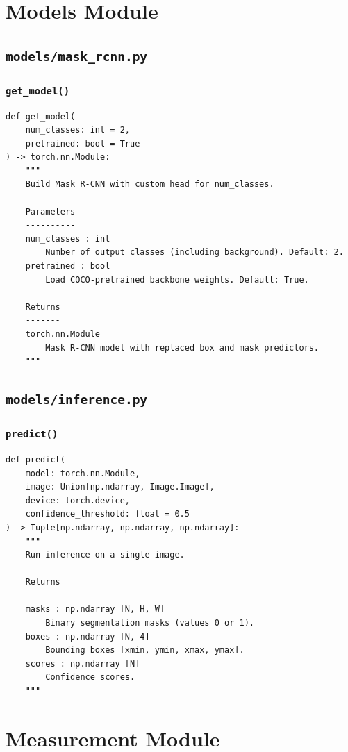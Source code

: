 \documentclass[12pt, a4paper, twoside]{report}
\begin{document}
\section{Models Module}

\subsection{\texttt{models/mask\_rcnn.py}}

\subsubsection{\texttt{get\_model()}}
\begin{lstlisting}[style=pythonstyle]
def get_model(
    num_classes: int = 2,
    pretrained: bool = True
) -> torch.nn.Module:
    """
    Build Mask R-CNN with custom head for num_classes.

    Parameters
    ----------
    num_classes : int
        Number of output classes (including background). Default: 2.
    pretrained : bool
        Load COCO-pretrained backbone weights. Default: True.

    Returns
    -------
    torch.nn.Module
        Mask R-CNN model with replaced box and mask predictors.
    """
\end{lstlisting}

\subsection{\texttt{models/inference.py}}

\subsubsection{\texttt{predict()}}
\begin{lstlisting}[style=pythonstyle]
def predict(
    model: torch.nn.Module,
    image: Union[np.ndarray, Image.Image],
    device: torch.device,
    confidence_threshold: float = 0.5
) -> Tuple[np.ndarray, np.ndarray, np.ndarray]:
    """
    Run inference on a single image.

    Returns
    -------
    masks : np.ndarray [N, H, W]
        Binary segmentation masks (values 0 or 1).
    boxes : np.ndarray [N, 4]
        Bounding boxes [xmin, ymin, xmax, ymax].
    scores : np.ndarray [N]
        Confidence scores.
    """
\end{lstlisting}

\section{Measurement Module}
\end{document}
